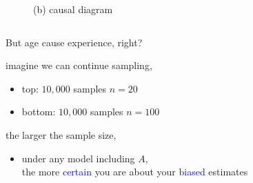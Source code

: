 \begin{frame}
\begin{columns}
\begin{column}{0.5\textwidth}
\begin{figure}
				\caption*{(b) causal diagram}
			\end{figure}
		\end{column}
	\end{columns}
\end{frame}
%
%
\begin{lhframe}[rhgraphic={\texttt{[image: descendant1b\_samplesize.pdf]}}]
	{But age cause experience, right?}
	
	imagine we can continue sampling,
	\begin{itemize}
		\item top: $10,000$ samples $n=20$
		\item bottom: $10,000$ samples $n=100$
	\end{itemize}
	
	the larger the sample size,
	\begin{itemize}
		\item under any model including $A$, \\
		the more \textcolor{blue}{certain} you are about your \textcolor{blue}{biased} estimates
	\end{itemize}
\end{lhframe}
%
%
